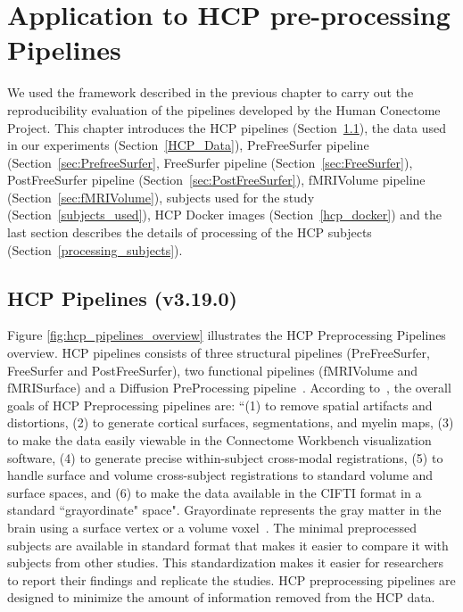 \chapter{Application to HCP pre-processing Pipelines}\label{pipelines}
\setlength{\parskip}{1em}
\setlength{\parindent}{4em}
We used the framework described in the previous chapter to carry out the reproducibility evaluation of the pipelines developed by the Human Conectome Project. This chapter introduces the HCP pipelines (Section~\ref{hcp_pipelines}), the data used in our experiments (Section~\ref{HCP_Data}), PreFreeSurfer pipeline (Section~\ref{sec:PrefreeSurfer}, FreeSurfer pipeline (Section~\ref{sec:FreeSurfer}), PostFreeSurfer pipeline (Section~\ref{sec:PostFreeSurfer}), fMRIVolume pipeline (Section~\ref{sec:fMRIVolume}), subjects used for the study (Section~\ref{subjects_used}), HCP Docker images (Section~\ref{hcp_docker}) and the last section describes the details of processing of the HCP subjects (Section~\ref{processing_subjects}).

\section{HCP Pipelines (v3.19.0)} \label{hcp_pipelines}
Figure \ref{fig:hcp_pipelines_overview} illustrates the HCP Preprocessing Pipelines overview. HCP pipelines consists of three structural pipelines (PreFreeSurfer, FreeSurfer and PostFreeSurfer), two functional pipelines (fMRIVolume and fMRISurface) and a Diffusion PreProcessing pipeline~\cite{Gla13}. According to~\cite{Gla13}, the overall goals of HCP Preprocessing pipelines are: ``(1) to remove spatial artifacts and distortions, (2) to generate cortical surfaces, segmentations, and myelin maps, (3) to make the data easily viewable in the Connectome Workbench visualization software, (4) to generate precise within-subject cross-modal registrations, (5) to handle surface and volume cross-subject registrations to standard volume and surface spaces, and (6) to make the data available in the CIFTI format in a standard ``grayordinate" space". Grayordinate represents the gray matter in the brain using a surface vertex or a volume voxel~\cite{Grayordinate}. The minimal preprocessed subjects are available in standard format that makes it easier to compare it with subjects from other studies. This standardization makes it easier for researchers to report their findings and replicate the studies. HCP preprocessing pipelines are designed to minimize the amount of information removed from the HCP data.


